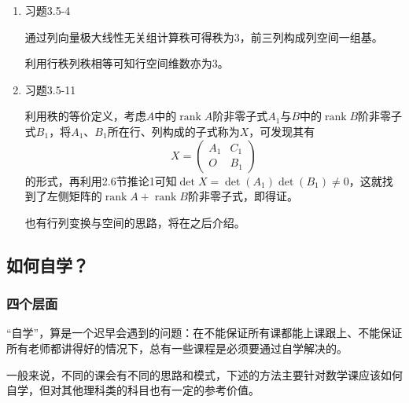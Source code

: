\documentclass[a4paper,UTF8,fontset=windows]{ctexart}
\DeclareMathOperator{\rank}{rank}
\newcommand*{\note}{\noindent *}
\begin{document}
\begin{enumerate}
    \item 习题3.5-4
    
    通过列向量极大线性无关组计算秩可得秩为3，前三列构成列空间一组基。

    利用行秩列秩相等可知行空间维数亦为3。

    \item 习题3.5-11
    
    利用秩的等价定义，考虑$A$中的$\rank A$阶非零子式$A_1$与$B$中的$\rank B$阶非零子式$B_1$，将$A_1$、$B_1$所在行、列构成的子式称为$X$，可发现其有
    $$X=\begin{pmatrix}A_1&C_1\\O&B_1\end{pmatrix}$$
    的形式，再利用2.6节推论1可知$\det X=\det(A_1)\det(B_1)\ne 0$，这就找到了左侧矩阵的$\rank A+\rank B$阶非零子式，即得证。

    \note 也有行列变换与空间的思路，将在之后介绍。
\end{enumerate}

\subsection{如何自学？}
\subsubsection{四个层面}
``自学''，算是一个迟早会遇到的问题：在不能保证所有课都能上课跟上、不能保证所有老师都讲得好的情况下，总有一些课程是必须要通过自学解决的。

一般来说，不同的课会有不同的思路和模式，下述的方法主要针对数学课应该如何自学，但对其他理科类的科目也有一定的参考价值。
\end{document}

